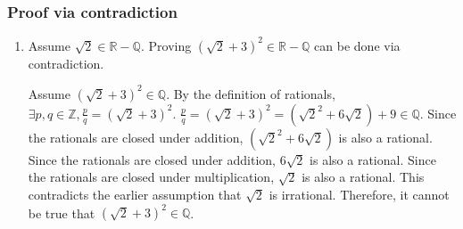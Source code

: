\documentclass[12pt, leqno]{article}
\newcommand{\Z}{\mathbb{Z}}
\begin{document}
\subsubsection{Proof via contradiction}

\begin{enumerate}
    \item Assume $\sqrt{2} \in \mathbb{R} - \mathbb{Q}$. Proving $(\sqrt{2} + 3)^2 \in \mathbb{R} - \mathbb{Q}$ can be done via contradiction.
    
    Assume $(\sqrt{2} + 3)^2 \in \mathbb{Q}$. By the definition of rationals, $\exists p, q \in \Z, \frac p q = (\sqrt{2} + 3)^2$. $\frac p q = (\sqrt{2} + 3)^2 = (\sqrt{2}^2 + 6\sqrt{2}) + 9 \in \mathbb Q$. Since the rationals are closed under addition, $(\sqrt{2}^2 + 6\sqrt{2})$ is also a rational. Since the rationals are closed under addition, $6\sqrt{2}$ is also a rational. Since the rationals are closed under multiplication, $\sqrt{2}$ is also a rational. This contradicts the earlier assumption that $\sqrt{2}$ is irrational. Therefore, it cannot be true that $(\sqrt{2} + 3)^2 \in \mathbb{Q}$.
\end{enumerate}
\end{document}
